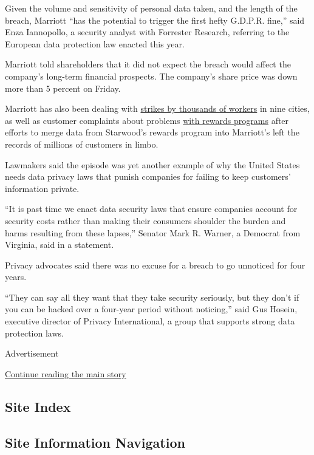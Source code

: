 Given the volume and sensitivity of personal data taken, and the length
of the breach, Marriott ``has the potential to trigger the first hefty
G.D.P.R. fine,'' said Enza Iannopollo, a security analyst with Forrester
Research, referring to the European data protection law enacted this
year.

Marriott told shareholders that it did not expect the breach would
affect the company's long-term financial prospects. The company's share
price was down more than 5 percent on Friday.

Marriott has also been dealing with
\href{https://www.nytimes.com/2018/11/29/travel/marriott-strikes-hawaii-settle-not-an-francisco-.html}{strikes
by thousands of workers} in nine cities, as well as customer complaints
about problems
\href{https://www.nytimes.com/2018/10/08/business/marriott-hotel-reward-program-members.html}{with
rewards programs} after efforts to merge data from Starwood's rewards
program into Marriott's left the records of millions of customers in
limbo.

Lawmakers said the episode was yet another example of why the United
States needs data privacy laws that punish companies for failing to keep
customers' information private.

``It is past time we enact data security laws that ensure companies
account for security costs rather than making their consumers shoulder
the burden and harms resulting from these lapses,'' Senator Mark R.
Warner, a Democrat from Virginia, said in a statement.

Privacy advocates said there was no excuse for a breach to go unnoticed
for four years.

``They can say all they want that they take security seriously, but they
don't if you can be hacked over a four-year period without noticing,''
said Gus Hosein, executive director of Privacy International, a group
that supports strong data protection laws.

Advertisement

\protect\hyperlink{after-bottom}{Continue reading the main story}

\hypertarget{site-index}{%
\subsection{Site Index}\label{site-index}}

\hypertarget{site-information-navigation}{%
\subsection{Site Information
Navigation}\label{site-information-navigation}}

